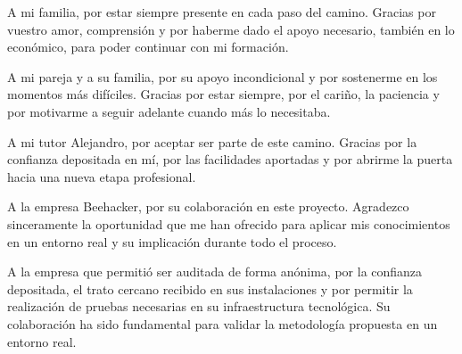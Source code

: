 \documentclass[a4paper, 11pt]{article}
\begin{document}
\begin{adjustwidth}{3cm}{3cm}

A mi familia, por estar siempre presente en cada paso del camino. Gracias por vuestro amor, comprensión y por haberme dado el apoyo necesario, también en lo económico, para poder continuar con mi formación.

A mi pareja y a su familia, por su apoyo incondicional y por sostenerme en los momentos más difíciles. Gracias por estar siempre, por el cariño, la paciencia y por motivarme a seguir adelante cuando más lo necesitaba.

A mi tutor Alejandro, por aceptar ser parte de este camino. Gracias por la confianza depositada en mí, por las facilidades aportadas y por abrirme la puerta hacia una nueva etapa profesional.

A la empresa Beehacker, por su colaboración en este proyecto. Agradezco sinceramente la oportunidad que me han ofrecido para aplicar mis conocimientos en un entorno real y su implicación durante todo el proceso.

A la empresa que permitió ser auditada de forma anónima, por la confianza depositada, el trato cercano recibido en sus instalaciones y por permitir la realización de pruebas necesarias en su infraestructura tecnológica. Su colaboración ha sido fundamental para validar la metodología propuesta en un entorno real.
\end{adjustwidth}
\clearpage

\setlength{\parskip}{0.1em}  %

\thispagestyle{nohead}
\renewcommand{\contentsname}{Índice General}
\tableofcontents
\clearpage

\listoffigures
\thispagestyle{nohead}
\clearpage

\listoftables
{}
\thispagestyle{nohead}
\clearpage

\renewcommand{\lstlistlistingname}{Índice de Códigos}
\thispagestyle{nohead}
\lstlistoflistings
{}

\clearpage


\end{document}
